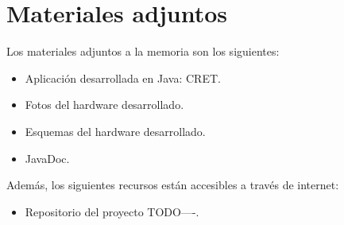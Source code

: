 \section{Materiales adjuntos}\label{materiales-adjuntos}

Los materiales adjuntos a la memoria son los siguientes:

\begin{itemize}
\tightlist
\item
	Aplicación desarrollada en Java: CRET.
\item	
	Fotos del hardware desarrollado.
\item
	Esquemas del hardware desarrollado.
\item	
	JavaDoc.
\end{itemize}

Además, los siguientes recursos están accesibles a través de internet:

\begin{itemize}
\tightlist
\item
  Repositorio del proyecto TODO----.
\end{itemize}
